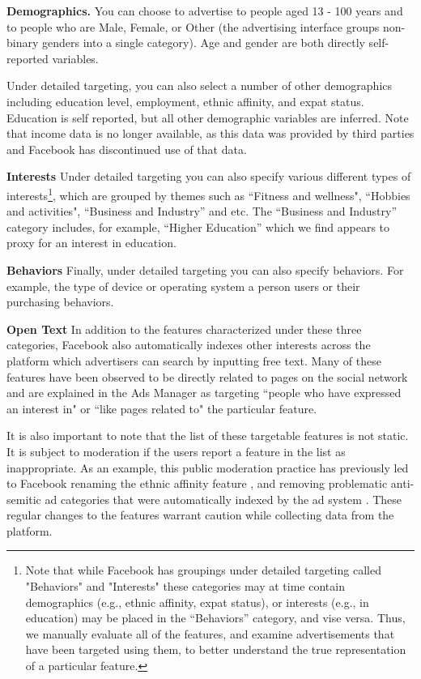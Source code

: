 \textbf{Demographics.} You can choose to advertise to people aged 13 - 100 years and to people who are Male, Female, or Other (the advertising interface groups non-binary genders into a single category). Age and gender are both directly self-reported variables. 

Under detailed targeting, you can also select a number of other demographics including education level, employment, ethnic affinity, and expat status. Education is self reported, but all other demographic variables are inferred. Note that income data is no longer available, as this data was provided by third parties and Facebook has discontinued use of that data.

\textbf{Interests} Under detailed targeting you can also specify various different types of interests\footnote{Note that while Facebook has groupings under detailed targeting called "Behaviors" and "Interests" these categories may at time contain demographics (e.g., ethnic affinity, expat status), or interests (e.g., in education) may be placed in the ``Behaviors'' category, and vise versa. Thus, we manually evaluate all of the features, and examine advertisements that have been targeted using them, to better understand the true representation of a particular feature.}, which are grouped by themes such as ``Fitness and wellness", ``Hobbies and activities", ``Business and Industry'' and etc. The ``Business and Industry'' category includes, for example, ``Higher Education'' which we find appears to proxy for an interest in education.

\textbf{Behaviors} Finally, under detailed targeting you can also specify behaviors. For example, the type of device or operating system a person users or their purchasing behaviors.

\textbf{Open Text} In addition to the features characterized under these three categories, Facebook also automatically indexes other interests across the platform which advertisers can search by inputting free text. Many of these features have been observed to be directly related to pages on the social network and are explained in the Ads Manager as targeting ``people who have expressed an interest in" or ``like pages related to" the particular feature.

It is also important to note that the list of these targetable features is not static. It is subject to moderation if the users report a feature in the list as inappropriate. As an example, this public moderation practice has previously led to Facebook renaming the ethnic affinity feature \cite{propublica_fb_ethnic_affinity_again}, and removing problematic anti-semitic ad categories that were automatically indexed by the ad system \cite{propublica_jew_hater_study}. These regular changes to the features warrant caution while collecting data from the platform.

